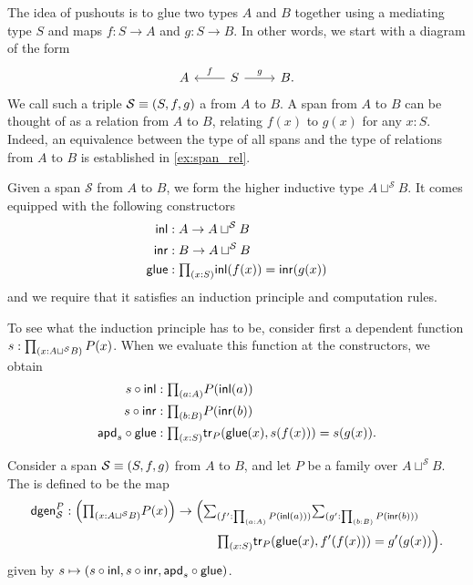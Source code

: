 The idea of pushouts is to glue two types $A$ and $B$ together using a mediating type $S$ and maps $f:S\to A$ and $g:S\to B$. In other words, we start with a diagram of the form
\begin{equation*}
\begin{tikzcd}
A & S \arrow[l,swap,"f"] \arrow[r,"g"] & B.
\end{tikzcd}
\end{equation*}
We call such a triple $\mathcal{S}\equiv (S,f,g)$ a  from $A$ to $B$.
A span from $A$ to $B$ can be thought of as a relation from $A$ to $B$, relating $f(x)$ to $g(x)$ for any $x:S$.
Indeed, an equivalence between the type of all spans and the type of relations from $A$ to $B$ is established in \cref{ex:span_rel}.

Given a span $\mathcal{S}$ from $A$ to $B$, we form the higher inductive type $A \sqcup^{\mathcal{S}} B$. It comes equipped with the following constructors
\begin{align*}
\inl & : A \to A \sqcup^{\mathcal{S}} B \\
\inr & : B \to A \sqcup^{\mathcal{S}} B \\
\glue & : \prd{x:S} \inl(f(x))=\inr(g(x))
\end{align*}
and we require that it satisfies an induction principle and computation rules.

To see what the induction principle has to be, consider first a dependent function $s:\prd{x:A\sqcup^{\mathcal{S}}B}P(x)$. When we evaluate this function at the constructors, we obtain
\begin{align*}
s\circ \inl & : \prd{a:A} P(\inl(a)) \\
s\circ \inr & : \prd{b:B} P(\inr(b)) \\
\apdfunc{s}\circ \glue & : \prd{x:S} \mathsf{tr}_P(\glue(x),s(f(x)))=s(g(x)).
\end{align*}

\begin{defn}
Consider a span $\mathcal{S}\equiv (S,f,g)$ from $A$ to $B$, and let $P$ be a family over $A\sqcup^{\mathcal{S}} B$. The  is defined to be the map
\begin{align*}
\mathsf{dgen}_{\mathcal{S}}^P & : \Big(\prd{x:A\sqcup^{\mathcal{S}} B} P(x)\Big) \to \Big(\sm{f': \prd{a:A}P(\inl(a))}{g':\prd{b:B}P(\inr(b))}\Big.\\
& \qquad\qquad\qquad\qquad\qquad\qquad \Big.\prd{x:S} \mathsf{tr}_P(\glue(x),f'(f(x)))=g'(g(x))\Big).
\end{align*}
given by $s\mapsto (s\circ{\mathsf{inl}},s\circ{\mathsf{inr}},\mathsf{apd}_{s}\circ\mathsf{glue})$.
\end{defn}

